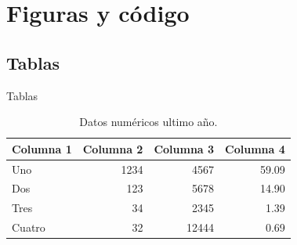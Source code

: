 \documentclass[11pt, aspectratio=169]{beamer}
\begin{document}
\section{Figuras y código}
\subsection{Tablas}
\begin{frame}{Tablas}
    \begin{table}[!b]
    \begin{tabularx}{\textwidth}{Xrrr}
        \textbf{Columna 1} & \textbf{Columna 2} & \textbf{Columna 3} & \textbf{Columna 4} \\
        \toprule
        Uno       	& 1234  & 4567   & 59.09 \\
        Dos 			& 123    & 5678   & 14.90 \\
        Tres 			& 34      & 2345   & 1.39  \\
        Cuatro 		& 32      & 12444 & 0.69  \\
        \bottomrule
    \end{tabularx}
    \caption{Datos numéricos ultimo año.}
    \end{table}
\end{frame}
\end{document}
